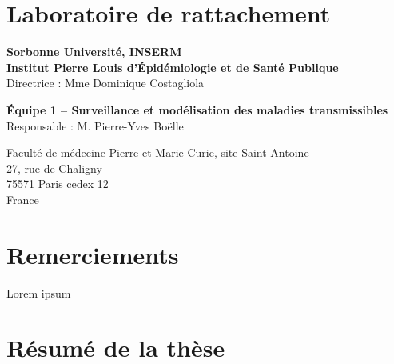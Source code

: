 
\clearpage
\clearpage
\section*{Laboratoire de rattachement}
\vspace{2em}

\begin{center}
{\bf Sorbonne Université, INSERM \\ 
Institut Pierre Louis d’Épidémiologie et de Santé Publique} \\
Directrice : Mme Dominique Costagliola

\vspace{2em}
{\bf Équipe 1 -- Surveillance et modélisation des maladies transmissibles} \\
Responsable : M. Pierre-Yves Boëlle

\vspace{2em}
Faculté de médecine Pierre et Marie Curie, site Saint-Antoine \\
27, rue de Chaligny \\
75571 Paris cedex 12 \\
France
\end{center}

\clearpage
\section*{Remerciements}
\vspace{2em}

Lorem ipsum

\clearpage
\section*{Résumé de la thèse}
\vspace{2em}\doublespacing

